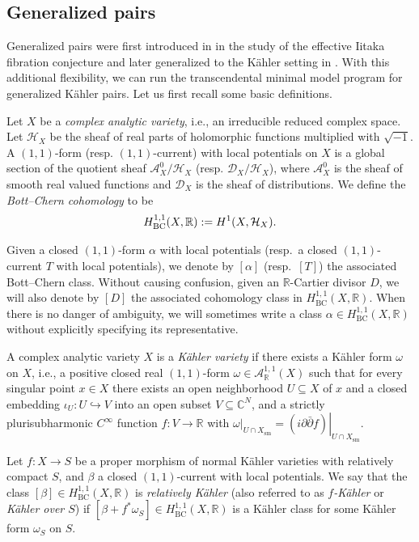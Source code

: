 \documentclass[12pt]{amsart}
\numberwithin{equation}{section}
\theoremstyle{definition}
\theoremstyle{plain}
\newtheorem*{thm A*}{Theorem A}
\newtheorem*{thm B*}{Theorem B}
\newtheorem*{thm C*}{Theorem C}
\newtheorem*{thm D*}{Theorem D}
\theoremstyle{definition}
\renewcommand{\1}{\mathds{1}}
\renewcommand{\>}{\rightarrow}
\begin{document}
\subsection{Generalized pairs}
Generalized pairs were first introduced in \cite{BZ16} in the study of the effective Iitaka fibration conjecture and later generalized to the K\"ahler setting in \cite{DHY23}. With this additional flexibility, we can run the transcendental minimal model program for generalized K\"ahler pairs. Let us first recall some basic definitions. 

Let $X$ be a \emph{complex analytic variety}, i.e., an irreducible reduced complex space. Let $\mathcal{H}_X$ be the sheaf of real parts of holomorphic functions multiplied with $\sqrt{-1}$. A $(1,1)$-form (resp. $(1,1)$-current) with local potentials on $X$ is a global section of the quotient sheaf $\mathcal{A}_X^0 / \mathcal{H}_X$ (resp. $\mathcal{D}_X / \mathcal{H}_X$), where $\mathcal{A}_X^0$ is the sheaf of smooth real valued functions and $\mathcal{D}_X$ is the sheaf of  distributions. We define the \emph{Bott--Chern cohomology} to be $$H^{1,1}_{\rm{BC}}(X,\mathbb{R}) : = H^1(X,\mathcal{H}_X).$$

Given a closed $(1,1)$-form $\alpha$ with local potentials (resp.\ a closed $(1,1)$-current $T$ with local potentials), we denote by $[\alpha]$ (resp.\ $[T]$) the associated Bott--Chern class. Without causing confusion, given an $\mathbb{R}$-Cartier divisor $D$, we will also denote by $[D]$ the associated cohomology class in $H^{1,1}_{\mathrm{BC}}(X,\mathbb{R})$. When there is no danger of ambiguity, we will sometimes write a class $\alpha \in H^{1,1}_{\mathrm{BC}}(X,\mathbb{R})$ without explicitly specifying its representative.

A complex analytic variety $X$ is a \emph{K\"ahler variety} if there exists a K\"ahler form $\omega$ on $X$, i.e., a positive closed real $(1,1)$-form $\omega \in \mathcal{A}_{\mathbb{R}}^{1,1}(X)$ such that for every singular point $x \in X$ there exists an open neighborhood $U \subseteq X$ of $x$ and a closed embedding $\iota_U: U \hookrightarrow V$ into an open subset $V \subseteq \mathbb{C}^N$, and a strictly plurisubharmonic $C^{\infty}$ function $f: V \rightarrow \mathbb{R}$ with $\left.\omega\right|_{U \cap X_{\mathrm{sm}}}=\left.(i \partial \bar{\partial} f)\right|_{U \cap X_{\mathrm{sm}}}$.


Let $f: X \rightarrow S$ be a proper morphism of normal K\"ahler varieties with relatively compact $S$, and $\beta$  a closed $(1,1)$-current with local potentials. We say that the class $[\beta] \in H_{\mathrm{BC}}^{1,1}(X,\mathbb{R})$ is \emph{relatively K\"ahler} (also referred to as \emph{$f$-K\"ahler} or \emph{K\"ahler over $S$}) if $\left[\beta+f^* \omega_S\right] \in H_{\mathrm{BC}}^{1,1}(X,\mathbb{R})$ is a K\"ahler class for some K\"ahler form $\omega_S$ on $S$.
\end{document}
